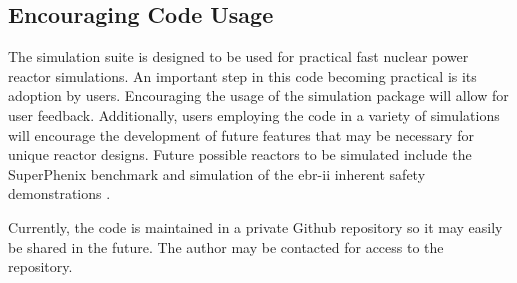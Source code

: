   \subsection{Encouraging Code Usage}
    The simulation suite is designed to be used for practical fast nuclear power
    reactor simulations. An important step in this code becoming practical is 
    its adoption by users. Encouraging the usage of the simulation package will
    allow for user feedback. Additionally, users employing the code in a variety
    of simulations will encourage the development of future features that may be
    necessary for unique reactor designs. Future possible reactors to be 
    simulated include the SuperPhenix benchmark and simulation of the
    \gls{ebr-ii} inherent safety demonstrations \cite{ebriitests}.
    
    \renewcommand{\thefootnote}{\fnsymbol{footnote}}
    Currently, the code is maintained in a private Github repository so it may 
    easily be shared in the future. The author may be contacted\footnotemark 
    for access to the repository. 



\glsresetall
